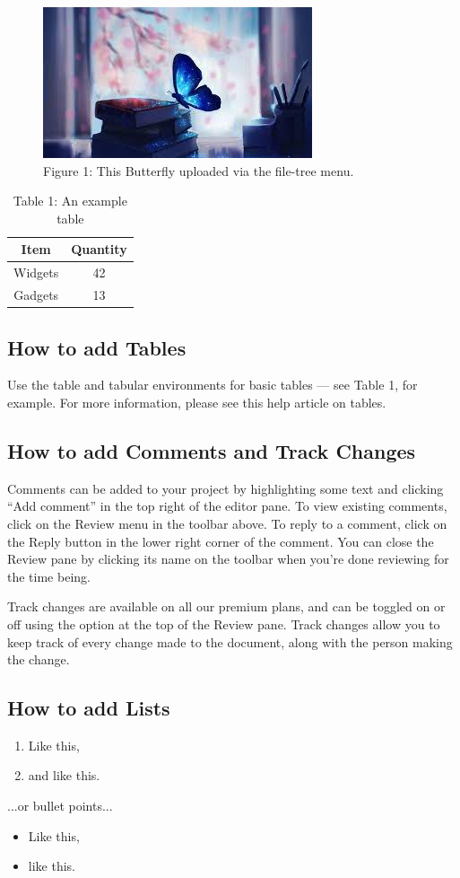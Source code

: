 \documentclass{article}
\begin{document}
	\begin{figure}[h]
		\centering
		\includegraphics[width=0.5\linewidth]{click.jpg}
		\caption{Figure 1: This Butterfly uploaded via the file-tree menu.}
	\end{figure}
	
	\begin{table}[h]
		\centering
		\begin{tabular}{|c|c|}
			\hline 
			\textbf{Item} & \textbf{Quantity} \\
			\hline 
			Widgets & 42 \\
			\hline
			Gadgets & 13 \\
			\hline
		\end{tabular}
		\caption{Table 1: An example table}
	\end{table}
	
	\subsection{How to add Tables}
	Use the table and tabular environments for basic tables — see Table 1, for example. For more information, please see this help article on tables.
	
	\subsection{How to add Comments and Track Changes}
	Comments can be added to your project by highlighting some text and clicking “Add comment” in the top right of the editor pane. To view existing comments, click on the Review menu in the toolbar above. To reply to a comment, click on the Reply button in the lower right corner of the comment. You can close the Review pane by clicking its name on the toolbar when you’re done reviewing for the time being.
	
	Track changes are available on all our premium plans, and can be toggled on or off using the option at the top of the Review pane. Track changes allow you to keep track of every change made to the document, along with the person making the change.
	
	\subsection{How to add Lists}
	\begin{enumerate}
		\item Like this,
		\item and like this.
	\end{enumerate}
	...or bullet points...
	\begin{itemize}
	    \item Like this,
	    \item like this.
	\end{itemize}
	
\end{document}

